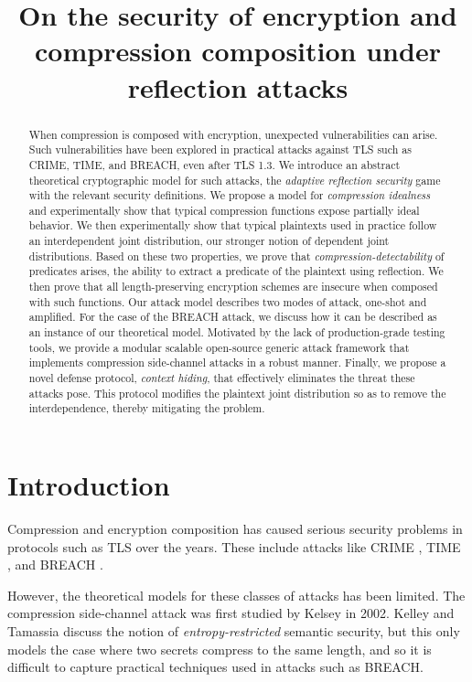 \documentclass[conference, letterpaper, 10pt]{IEEEtran}
\title{On the security of encryption and compression composition under reflection attacks}
\author{
     \IEEEauthorblockN{Dimitris Karakostas}
     \IEEEauthorblockA{University of Athens \\
     dimit.karakostas@gmail.com}
     \and
     \IEEEauthorblockN{Aggelos Kiayias}
     \IEEEauthorblockA{University of Edinburgh\\
     akiayias@inf.ed.ac.uk}
     \and
     \IEEEauthorblockA{Dionysis Zindros}
     \IEEEauthorblockA{University of Athens \\
     dionyziz@di.uoa.gr}
 }
\begin{document}
\maketitle

\begin{abstract}
When compression is composed with encryption, unexpected vulnerabilities can
arise. Such vulnerabilities have been explored in practical attacks against TLS
such as CRIME, TIME, and BREACH, even after TLS 1.3. We introduce an abstract
theoretical cryptographic model for such attacks, the \textit{adaptive
reflection security} game with the relevant security definitions. We propose a
model for \textit{compression idealness} and experimentally show that typical compression
functions expose partially ideal behavior. We then experimentally show that
typical plaintexts used in practice follow an interdependent joint distribution,
our stronger notion of dependent joint distributions. Based on these two
properties, we prove that \textit{compression-detectability} of predicates
arises, the ability to extract a predicate of the plaintext using reflection.
We then prove that all length-preserving encryption schemes are insecure when
composed with such functions. Our attack model describes two modes of attack,
one-shot and amplified. For the case of the BREACH attack, we discuss how it can
be described as an instance of our theoretical model. Motivated by the lack of
production-grade testing tools, we provide a modular scalable open-source
generic attack framework that implements compression side-channel attacks in a
robust manner. Finally, we propose a novel defense protocol, \textit{context
hiding}, that effectively eliminates the threat these attacks pose. This
protocol modifies the plaintext joint distribution so as to remove the
interdependence, thereby mitigating the problem.
\end{abstract}

\section{Introduction}\label{sec:prev}

Compression and encryption composition has caused serious security problems
in protocols such as TLS \cite{c15} over the years. These
include attacks like CRIME \cite{c1}, TIME \cite{c2}, and BREACH \cite{c3}.

However, the theoretical models for these classes of attacks has been limited.
The compression side-channel attack was first studied by Kelsey \cite{c4} in 2002.
Kelley and Tamassia\cite{c5}  discuss the notion of \textit{entropy-restricted} semantic
security, but this only models the case where two secrets compress to the same
length, and so it is difficult to capture practical techniques used in attacks
such as BREACH.
\end{document}
